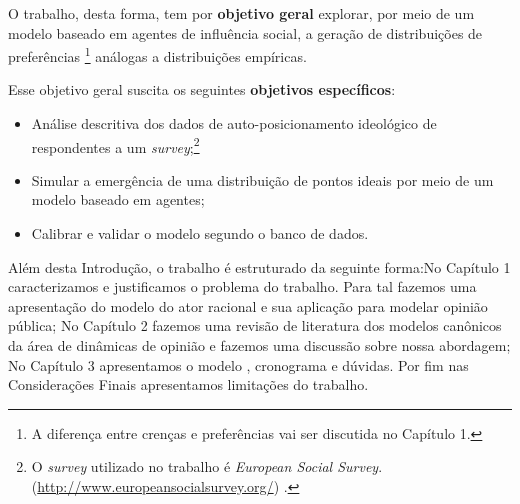 O trabalho, desta forma, tem por \textbf{objetivo geral} explorar, por meio
de um modelo baseado em agentes de influência social, a geração de distribuições
de preferências \footnote{A diferença entre crenças e preferências vai ser
discutida no Capítulo 1.} análogas a distribuições empíricas.

Esse objetivo geral suscita os seguintes \textbf{objetivos específicos}:

\begin{itemize}
\item Análise descritiva dos dados de auto-posicionamento ideológico de
  respondentes a um \textit{survey};\footnote{ O \textit{survey} utilizado no
    trabalho é \textit{European Social Survey}.
    (\url{http://www.europeansocialsurvey.org/}) .}
\item Simular a emergência de uma distribuição de pontos ideais por meio de um
  modelo baseado em agentes; 
\item Calibrar e validar o modelo segundo o banco de dados.
\end{itemize}

Além desta Introdução, o trabalho é estruturado da seguinte forma:No Capítulo 1
caracterizamos e justificamos o problema do trabalho. Para tal fazemos uma
apresentação do modelo do ator racional e sua aplicação para modelar opinião
pública; No Capítulo 2 fazemos uma revisão de literatura dos modelos canônicos
da área de dinâmicas de opinião e fazemos uma discussão sobre nossa abordagem;
No Capítulo 3 apresentamos o modelo , cronograma e dúvidas. Por fim nas
Considerações Finais apresentamos limitações do trabalho.








